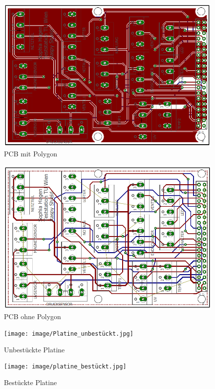 \newpage
\begin{figure}[H]
	\centering
	\includegraphics[scale=0.8]{image/workp.png}
	\caption{PCB mit Polygon}
	\label{fig:enter-label}
\end{figure}
\begin{figure}[H]
	\centering
	\includegraphics[scale=0.8]{image/worko.png}
	\caption{PCB ohne Polygon}
	\label{fig:enter-label}
\end{figure}
\pagebreak
\begin{figure}[H]
\centering
    \texttt{[image: image/Platine\_unbestückt.jpg]}
    \caption{Unbestückte Platine}
\end{figure}
\begin{figure}[H]
\centering
    \texttt{[image: image/platine\_bestückt.jpg]}
    \caption{Bestückte Platine}
\end{figure}